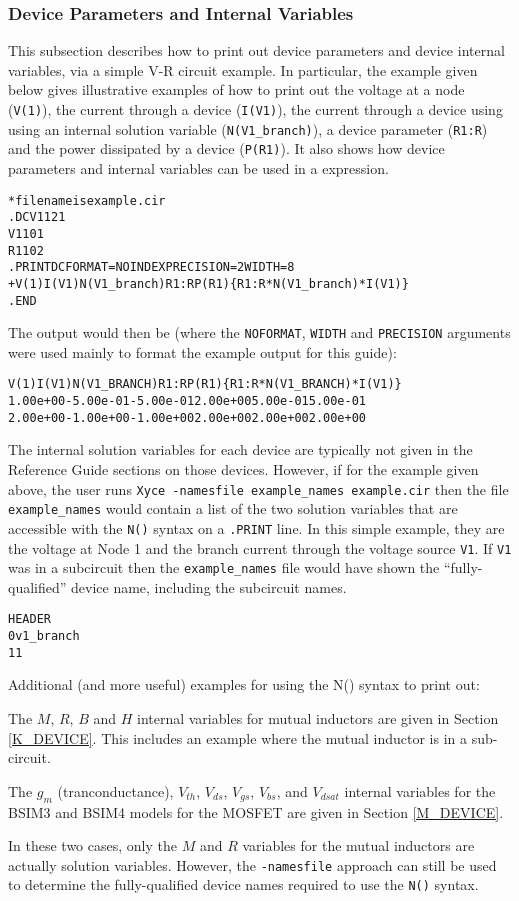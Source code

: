 \subsubsection{Device Parameters and Internal Variables}
\label{Print_Device_Info}
This subsection describes how to print out device parameters and device 
internal variables, via a simple V-R circuit example. In particular, 
the example given below gives illustrative examples of how to print out the voltage
at a node ({\tt V(1)}), the current through a device ({\tt I(V1)}), the current through
a device using using an internal solution variable ({\tt N(V1\_branch)}), a device 
parameter ({\tt R1:R}) and the power dissipated by a device ({\tt P(R1)}).  It also shows
how device parameters and internal variables can be used in a \Xyce{} expression.
\begin{alltt}
* filename is example.cir
.DC V1 1 2 1
V1 1 0 1
R1 1 0 2
.PRINT DC FORMAT=NOINDEX PRECISION=2 WIDTH=8 
+ V(1) I(V1) N(V1_branch) R1:R P(R1) \{R1:R*N(V1_branch)*I(V1)\}
.END
\end{alltt}
The \Xyce{} output would then be (where the {\tt NOFORMAT}, {\tt WIDTH} and {\tt PRECISION}
arguments were used mainly to format the example output for this guide):
\begin{alltt}
   V(1)        I(V1)    N(V1\_BRANCH)    R1:R        P(R1)    \{R1:R*N(V1\_BRANCH)*I(V1)\}
   1.00e+00   -5.00e-01   -5.00e-01    2.00e+00    5.00e-01    5.00e-01
   2.00e+00   -1.00e+00   -1.00e+00    2.00e+00    2.00e+00    2.00e+00
\end{alltt}
The internal solution variables for each \Xyce{} device are typically not given in the Reference 
Guide sections on those devices.  However, if for the example given above, the user runs \texttt{Xyce 
-namesfile example\_names example.cir} then the file \texttt{example\_names} would contain a list
of the two solution variables that are accessible with the {\tt N()} syntax on a {\tt .PRINT} line.
In this simple example, they are the voltage at Node 1 and the branch current through the voltage
source {\tt V1}.  If {\tt V1} was in a subcircuit then the \texttt{example\_names} file would have shown
the ``fully-qualified'' device name, including the subcircuit names.
\begin{alltt}
HEADER
	0	   v1_branch
	1	           1
\end{alltt}
Additional (and more useful) examples for using the N() syntax to print out:
\begin{XyceItemize}
\item The $M$, $R$, $B$ and $H$ internal variables for mutual inductors are given in Section
   \ref{K_DEVICE}.  This includes an example where the mutual inductor is in a sub-circuit.
\item The $g_{m}$ (tranconductance), $V_{th}$, $V_{ds}$, $V_{gs}$, $V_{bs}$, and $V_{dsat}$ 
   internal variables for the BSIM3 and BSIM4 models for the MOSFET are given in 
   Section \ref{M_DEVICE}.
\end{XyceItemize}
In these two cases, only the $M$ and $R$ variables for the mutual inductors are
actually solution variables.  However, the {\tt -namesfile} approach can still be
used to determine the fully-qualified \Xyce{} device names required to use the {\tt N()}
syntax.

